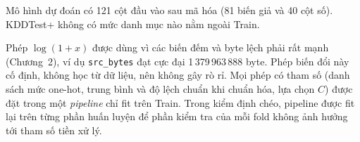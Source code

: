 \documentclass[../main.tex]{subfiles}
\begin{document}
\begin{table}[H]
\centering
\caption{Các bước chuẩn bị biến cho hồi quy Logistic}
\label{tab:t4:prep}
\small
\setlength{\tabcolsep}{3pt}
\par\smallskip\footnotesize Mô hình dự đoán có 121 cột đầu vào sau mã hóa (81 biến giả và 40 cột số). KDDTest+ không có mức danh mục nào nằm ngoài Train.
\end{table}

Phép $\log(1+x)$ được dùng vì các biến đếm và byte lệch phải rất mạnh (Chương~2), ví dụ \texttt{src\_bytes} đạt cực đại 1\,379\,963\,888 byte. Phép biến đổi này cố định, không học từ dữ liệu, nên không gây rò rỉ. Mọi phép có tham số (danh sách mức one-hot, trung bình và độ lệch chuẩn khi chuẩn hóa, lựa chọn $C$) được đặt trong một \emph{pipeline} chỉ fit trên Train. Trong kiểm định chéo, pipeline được fit lại trên từng phần huấn luyện để phần kiểm tra của mỗi fold không ảnh hưởng tới tham số tiền xử lý.
\end{document}
